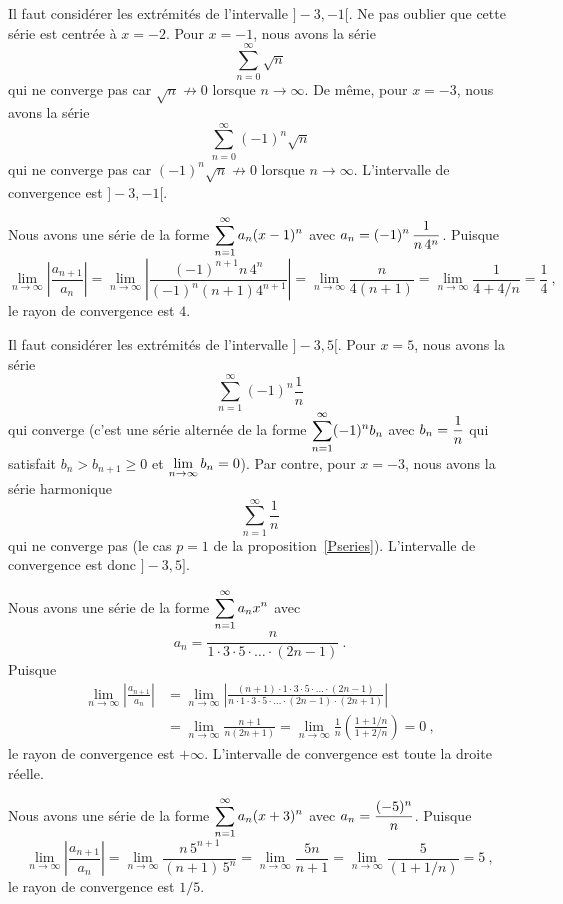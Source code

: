 {Il faut considérer les extrémités de l'intervalle $]-3,-1[$.  Ne pas
oublier que cette série est centrée à $x = -2$.
Pour $x=-1$, nous avons la série
\[
\sum_{n=0}^\infty \sqrt{n}
\]
qui ne converge pas car $\sqrt{n} \not\to 0$ lorsque $n\to \infty$.
De même, pour $x=-3$, nous avons la série
\[
\sum_{n=0}^\infty (-1)^n \sqrt{n}
\]
qui ne converge pas car $(-1)^n\sqrt{n} \not\to 0$ lorsque $n\to \infty$.
L'intervalle de convergence est $]-3,-1[$.

 Nous avons une série de la forme
$\displaystyle \sum_{n=1}^\infty a_n (x-1)^n$ avec
$\displaystyle a_n = (-1)^n \,\frac{1}{n\,4^n}$.   Puisque
\[
\lim_{n\rightarrow \infty} \left| \frac{a_{n+1}}{a_n} \right| =
\lim_{n\rightarrow \infty} \left| \frac{(-1)^{n+1} n\, 4^n}
{(-1)^n (n+1) 4^{n+1}} \right|
= \lim_{n\rightarrow \infty} \frac{n}{4(n+1)}
= \lim_{n\rightarrow \infty} \frac{1}{4+4/n}
= \frac{1}{4} \ ,
\]
le rayon de convergence est $4$.

Il faut considérer les extrémités de l'intervalle $]-3,5[$.
Pour $x=5$, nous avons la série
\[
\sum_{n=1}^\infty (-1)^n \frac{1}{n}
\]
qui converge (c'est une série alternée de la forme
$\displaystyle \sum_{n=1}^\infty (-1)^n b_n$ avec
$\displaystyle b_n = \frac{1}{n}$ qui satisfait
$b_n > b_{n+1} \geq 0$ et $\displaystyle \lim_{n\rightarrow \infty} b_n = 0$). 
Par contre, pour $x= -3$, nous avons la série harmonique
\[
\sum_{n=1}^\infty \frac{1}{n}
\]
qui ne converge pas (le cas $p=1$ de la proposition~\ref{Pseries}). 
L'intervalle de convergence est donc $]-3,5]$.

 Nous avons une série de la forme
$\displaystyle \sum_{n=1}^\infty a_n x^n$ avec
\[
a_n =
\frac{n}{ 1 \cdot 3 \cdot 5 \cdot \ldots \cdot (2n-1)} \ .
\]
Puisque
\begin{align*}
\lim_{n\rightarrow \infty} \left| \frac{a_{n+1}}{a_n} \right| &=
\lim_{n\rightarrow \infty}
\left| \frac{(n+1) \cdot 1 \cdot 3 \cdot 5 \cdot \ldots \cdot (2n-1)}
{n \cdot 1 \cdot 3 \cdot 5 \cdot \ldots \cdot (2n-1) \cdot (2n+1) }
\right| \\
&= \lim_{n\rightarrow \infty} \frac{n+1}{n(2n+1)}
= \lim_{n\rightarrow \infty} \frac{1}{n} \left(\frac{1+1/n}{1+2/n}\right)
= 0 \ ,
\end{align*}
le rayon de convergence est $+\infty$.
L'intervalle de convergence est toute la droite réelle.

 Nous avons une série de la forme
$\displaystyle \sum_{n=1}^\infty a_n (x+3)^n$ avec
$\displaystyle a_n = \frac{(-5)^n}{n}$.  Puisque
\[
\lim_{n\rightarrow \infty} \left| \frac{a_{n+1}}{a_n}\right| = 
\lim_{n\rightarrow \infty}
\frac{ n\,5^{n+1}}{(n+1)\,5^n}
= \lim_{n\rightarrow \infty} \frac{5n}{n+1}
= \lim_{n\rightarrow \infty} \frac{5}{(1+1/n)}
= 5  \ ,
\]
le rayon de convergence est $1/5$.

}
